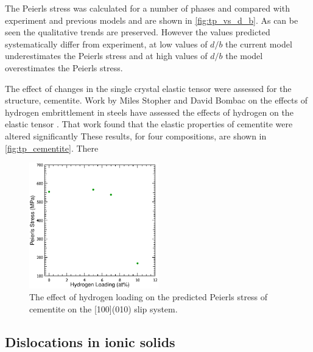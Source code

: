 The Peierls stress was calculated for a number of phases  and compared with experiment and previous models and are shown in \autoref{fig:tp_vs_d_b}. As can be seen the qualitative trends are preserved. However the values predicted systematically differ from experiment, at low values of $d/b$ the current model underestimates the Peierls stress and at high values of $d/b$ the model overestimates the Peierls stress.

The effect of changes in the single crystal elastic tensor were assessed for the  structure, cementite. Work by Miles Stopher and David Bombac on the effects of hydrogen embrittlement in steels have assessed the effects of hydrogen on the elastic tensor \cite{stopher2017}. That work found that the elastic properties of cementite were altered significantly
These results, for four compositions, are shown in \autoref{fig:tp_cementite}. There

\begin{figure}
\captionsetup{}
\centering
\includegraphics[width=0.5\textwidth]{Peierls_Stress_Cementite}
\caption{The effect of hydrogen loading on the predicted Peierls stress of cementite on the [100](010) slip system.\label{fig:tp_cementite}}
\end{figure}






























\FloatBarrier
\subsection{Dislocations in ionic solids}
\FloatBarrier


